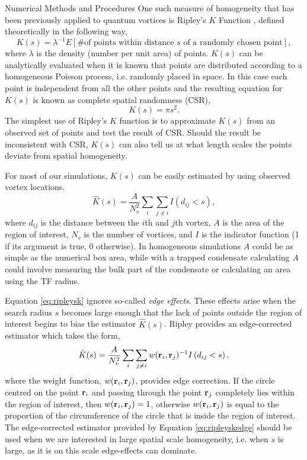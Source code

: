 \begin{chapter}{\label{cha:numerics}Numerical Methods and Procedures}
  One such measure of homogeneity that has been previously applied to quantum vortices \cite{bagg12} is Ripley's $K$ Function \cite{dixon_2002}, defined theoretically in the following way,
  \begin{equation}\label{eq:ripleysktheory}
    K(s) = \lambda^{-1}E[\text{\# of points within distance $s$ of a randomly chosen point}],
  \end{equation}
  where $\lambda$ is the density (number per unit area) of points. $K(s)$ can be analytically evaluated when it is known that points are distributed according to a homogeneous Poisson process, i.e. randomly placed in space. In this case each point is independent from all the other points and the resulting equation for $K(s)$ is known as complete spatial randomness (CSR),
  \begin{equation}\label{eq:ripleyskcsr}
    K(s) = \pi s^2.
  \end{equation}
  The simplest use of Ripley's $K$ function is to approximate $K(s)$ from an observed set of points and test the result of CSR. Should the result be inconsistent with CSR, $K(s)$ can also tell us at what length scales the points deviate from spatial homogeneity.

  For most of our simulations, $K(s)$ can be easily estimated by using observed vortex locations.
  \begin{equation}\label{eq:ripleysk}
    \hat{K}(s) = \frac{A}{N_v^2}\sum\limits_{i}\sum\limits_{j \ne i} I\left (d_{ij}<s\right ),
  \end{equation}
  where $d_{ij}$ is the distance between the $i$th and $j$th vortex, $A$ is the area of the region of interest, $N_v$ is the number of vortices, and $I$ is the indicator function (1 if its argument is true, 0 otherwise). In homogeneous simulations $A$ could be as simple as the numerical box area, while with a trapped condensate calculating $A$ could involve measuring the bulk part of the condensate or calculating an area using the TF radius.

  Equation \ref{eq:ripleysk} ignores so-called {\it edge effects}. These effects arise when the search radius $s$ becomes large enough that the lack of points outside the region of interest begins to bias the estimator $\hat{K}(s)$. Ripley provides an edge-corrected estimator \cite{ripley_1976} which takes the form,
  \begin{equation}\label{eq:ripleyskedge}
    \hat{K}(s) = \frac{A}{N_v^2}\sum\limits_{i}\sum\limits_{j \ne i} w({\bf r}_i,{\bf r}_j)^{-1}I\left (d_{ij}<s\right ),
  \end{equation}
  where the weight function, $w({\bf r}_i,{\bf r}_j)$, provides edge correction. If the circle centred on  the point ${\bf r}_i$ and passing through the point ${\bf r}_j$ completely lies within the region of interest, then $w({\bf r}_i,{\bf r}_j)=1$, otherwise $w({\bf r}_i,{\bf r}_j)$ is equal to the proportion of the circumference of the circle that is inside the region of interest. The edge-corrected estimator provided by Equation \ref{eq:ripleyskedge} should be used when we are interested in large spatial scale homogeneity, i.e. when $s$ is large, as it is on this scale edge-effects can dominate.


\end{chapter}
